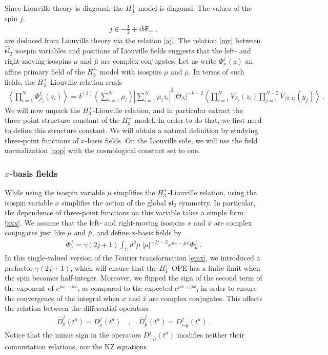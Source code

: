 \documentclass[12pt, a4paper, notitlepage, twoside]{report}
\numberwithin{equation}{section}
\theoremstyle{break}
\begin{document}
Since Liouville theory is diagonal, the $H_3^+$ model is diagonal.
The values of the spin $j$,
\begin{align}
 \boxed{j\in -\frac12 + ib\mathbb{R}_+}\ , 
\end{align}
are deduced from Liouville theory via the relation \eqref{aj}. The relation \eqref{my} between $\widehat{\mathfrak{sl}}_2$ isospin variables and positions of Liouville fields suggests that the left- and right-moving isospins $\mu$ and $\bar\mu$ are complex conjugates. Let us write $\Phi^j_\mu(z)$ an affine primary field of the $H_3^+$ model with isospins $\mu$ and $\bar\mu$. In terms of such fields, the $H_3^+$-Liouville relation reads 
\begin{align}
 \boxed{ \left\langle \prod_{i=1}^N \Phi^{j_i}_{\mu_i}(z_i)\right\rangle 
 = \delta^{(2)}\left({\textstyle\sum_{i=1}^N \mu_i}\right) 
 \left|{\textstyle\sum_{i=1}^N\mu_iz_i}\right|^2 |\Theta_N|^{-k-2} 
 \left\langle \prod_{i=1}^N V_{P_i}(z_i)\prod_{j=1}^{N-2}V_{\langle 2,1\rangle}(y_j)\right\rangle}\ .
\label{dyym} 
\end{align}
We will now unpack the $H_3^+$-Liouville relation, and in particular extract the three-point structure constant of the $H_3^+$ model. In order to do that, we first need to define this structure constant. We will obtain a natural definition by studying three-point functions of $x$-basis fields. On the Liouville side, we will use the field normalization \eqref{nop} with the cosmological constant set to one.

\subsubsection{$x$-basis fields}

While using the isospin variable $\mu$ simplifies the $H_3^+$-Liouville relation, using the isospin variable $x$ simplifies the action of the global $\mathfrak{sl}_2$ symmetry. 
In particular, the dependence of three-point functions on this variable takes a simple form \eqref{xxx}.
We assume that the left- and right-moving isospins $x$ and $\bar x$ are complex conjugates just like $\mu$ and $\bar\mu$, and define $x$-basis fields by 
\begin{align}
 \Phi^j_{x} = \gamma(2j+1)\int_{{\mathbb{C}}} d^2\mu\ |\mu|^{-2j-2} e^{\mu x -\bar{\mu}\bar{x}}\Phi^j_{\mu}\ .
\end{align}
In this single-valued version of the Fourier transformation \eqref{emx}, 
we introduced a prefactor $\gamma(2j+1)$, which will ensure that the $H_3^+$ OPE has a finite limit when the spin becomes half-integer.
Moreover, we flipped the sign of the second term of the exponent of $e^{\mu x -\bar{\mu}\bar{x}}$, as compared to the expected $e^{\mu x +\bar{\mu}\bar{x}}$, in order to ensure the convergence of the integral when $x$ and $\bar{x}$ are complex conjugates.
This affects the relation between the differential operators 
\begin{align}
 \bar{D}^j_{\bar{x}}(t^a) = D^j_{\bar{x}}(t^a)  \quad , \quad \bar{D}^j_{\bar{\mu}}(t^a) = D^j_{-\bar{\mu}}(t^a)\ . 
\end{align}
Notice that the minus sign in the operators $D^j_{-\bar{\mu}}(t^a)$ modifies neither their commutation relations, nor the KZ equations.
\end{document}
